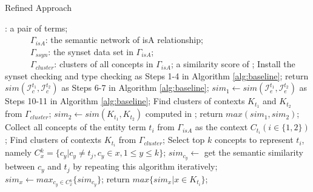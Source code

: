 %
%

\renewcommand\algorithmicrequire{\textbf{Input:}}
\renewcommand\algorithmicensure {\textbf{Output:}}
\begin{algorithm}[th]
\caption{Refined Approach}
\label{alg:refined}
\begin{algorithmic}[1]
\REQUIRE {}: a pair of terms;\\
~~~~~~$\Gamma_{isA}$: the semantic network of isA relationship;\\
~~~~~~$\Gamma_{ssyn}$: the synset data set in $\Gamma_{isA}$;\\
~~~~~~$\Gamma_{cluster}$: clusters of all concepts in $\Gamma_{isA}$;
\ENSURE a similarity score of ;
\STATE Install the synset checking and type checking as Steps 1-4 in Algorithm \ref{alg:baseline};
\STATE return $sim(\mathcal{I}_c^{t_1}, \mathcal{I}_c^{t_2})$ as Steps 6-7 in Algorithm \ref{alg:baseline};
\ENDIF
{}
\STATE $sim_1\leftarrow sim(\mathcal{I}_e^{t_1}, \mathcal{I}_e^{t_2})$ as Steps 10-11 in Algorithm \ref{alg:baseline};
\STATE Find clusters of contexts $K_{t_1}$ and $K_{t_2}$ from $\Gamma_{cluster}$;%
\STATE $sim_2\leftarrow sim(K_{t_1}, K_{t_2})$ computed in ;
\STATE return $max(sim_1, sim_2)$;
\ENDIF
{}
\STATE Collect all concepts of the entity term $t_i$ from $\Gamma_{isA}$ as the context $C_{t_i} (i\in\{1, 2\})$;
\STATE Find clusters of contexts $K_{t_i}$ from $\Gamma_{cluster}$;%
\STATE Select top $k$ concepts to represent $t_i$, namely $C{^{k}_{x}}=\{c_y|c_y \neq t_j,c_y\in x, 1\leq y \leq k\}$;
\STATE $sim_{c_y}\leftarrow$ get the semantic similarity between $c_y$ and $t_j$ by repeating this algorithm iteratively;
\ENDFOR
\STATE $sim_x\leftarrow max_{c_y\in C{^{k}_{x}}}\{sim_{c_y}\}$;
\ENDFOR
\STATE return $max\{sim_{x}|x\in K_{t_i}\}$;
\ENDIF
\end{algorithmic}
\end{algorithm}


